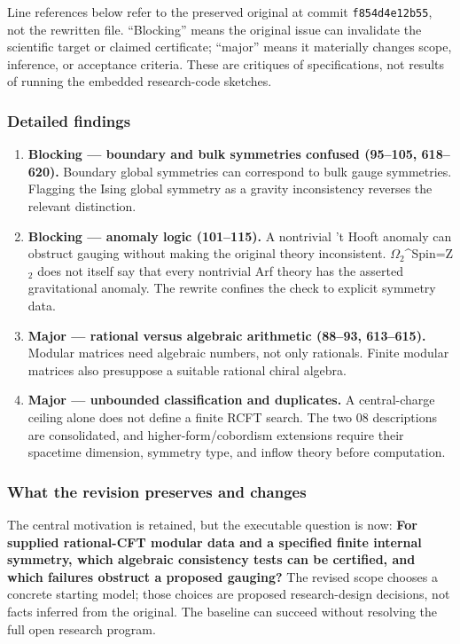 \documentclass[
  11pt,
]{article}
\begin{document}
Line references below refer to the preserved original at commit
\texttt{f854d4e12b55}, not the rewritten file. ``Blocking'' means the
original issue can invalidate the scientific target or claimed
certificate; ``major'' means it materially changes scope, inference, or
acceptance criteria. These are critiques of specifications, not results
of running the embedded research-code sketches.

\subsubsection{Detailed findings}

\begin{enumerate}
\def\labelenumi{\arabic{enumi}.}
\item
  \textbf{Blocking --- boundary and bulk symmetries confused (95--105,
  618--620).} Boundary global symmetries can correspond to bulk gauge
  symmetries. Flagging the Ising global symmetry as a gravity
  inconsistency reverses the relevant distinction.
\item
  \textbf{Blocking --- anomaly logic (101--115).} A nontrivial 't Hooft
  anomaly can obstruct gauging without making the original theory
  inconsistent.
  \ensuremath{\Omega}\ensuremath{{}_{2}}\textasciicircum{}Spin=Z\ensuremath{{}_{2}}
  does not itself say that every nontrivial Arf theory has the asserted
  gravitational anomaly. The rewrite confines the check to explicit
  symmetry data.
\item
  \textbf{Major --- rational versus algebraic arithmetic (88--93,
  613--615).} Modular matrices need algebraic numbers, not only
  rationals. Finite modular matrices also presuppose a suitable rational
  chiral algebra.
\item
  \textbf{Major --- unbounded classification and duplicates.} A
  central-charge ceiling alone does not define a finite RCFT search. The
  two 08 descriptions are consolidated, and higher-form/cobordism
  extensions require their spacetime dimension, symmetry type, and
  inflow theory before computation.
\end{enumerate}

\subsubsection{What the revision preserves and changes}

The central motivation is retained, but the executable question is now:
\textbf{For supplied rational-CFT modular data and a specified finite
internal symmetry, which algebraic consistency tests can be certified,
and which failures obstruct a proposed gauging?} The revised scope
chooses a concrete starting model; those choices are proposed
research-design decisions, not facts inferred from the original. The
baseline can succeed without resolving the full open research program.
\end{document}
